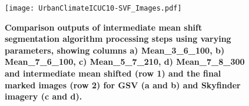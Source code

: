 \documentclass[final,3p,times,authoryear]{elsarticle}
\begin{document}
%


\begin{figure}
\centering 
\texttt{[image: UrbanClimateICUC10-SVF\_Images.pdf]} 
\caption{\bf Comparison outputs of intermediate mean shift segmentation algorithm processing steps using varying parameters, showing columns a) Mean\_3\_6\_100, b) Mean\_7\_6\_100, c) Mean\_5\_7\_210, d) Mean\_7\_8\_300 and intermediate mean shifted (row 1) and the final marked images (row 2) for GSV (a and b) and Skyfinder imagery (c and d). }
 \label{fig:meanresults}  
\end{figure} 
\end{document}
